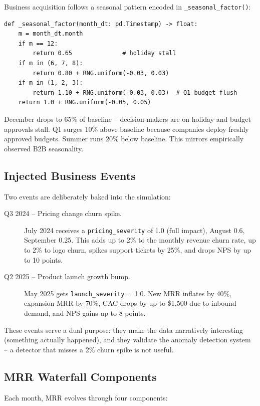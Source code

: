 Business acquisition follows a seasonal pattern encoded in \texttt{\_seasonal\_factor()}:

\begin{lstlisting}[style=python, caption={Seasonal multiplier for new business.}]
def _seasonal_factor(month_dt: pd.Timestamp) -> float:
    m = month_dt.month
    if m == 12:
        return 0.65              # holiday stall
    if m in (6, 7, 8):
        return 0.80 + RNG.uniform(-0.03, 0.03)
    if m in (1, 2, 3):
        return 1.10 + RNG.uniform(-0.03, 0.03)  # Q1 budget flush
    return 1.0 + RNG.uniform(-0.05, 0.05)
\end{lstlisting}

December drops to 65\% of baseline -- decision-makers are on holiday and budget approvals stall. Q1 surges 10\% above baseline because companies deploy freshly approved budgets. Summer runs 20\% below baseline. This mirrors empirically observed B2B seasonality.

\subsection{Injected Business Events}

Two events are deliberately baked into the simulation:

\begin{description}
  \item[Q3 2024 -- Pricing change churn spike.] July 2024 receives a \texttt{pricing\_severity} of 1.0 (full impact), August 0.6, September 0.25. This adds up to 2\% to the monthly revenue churn rate, up to 2\% to logo churn, spikes support tickets by 25\%, and drops NPS by up to 10 points.
  \item[Q2 2025 -- Product launch growth bump.] May 2025 gets \texttt{launch\_severity} = 1.0. New MRR inflates by 40\%, expansion MRR by 70\%, CAC drops by up to \$1,500 due to inbound demand, and NPS gains up to 8 points.
\end{description}

These events serve a dual purpose: they make the data narratively interesting (something actually happened), and they validate the anomaly detection system -- a detector that misses a 2\% churn spike is not useful.

\subsection{MRR Waterfall Components}

Each month, MRR evolves through four components:

